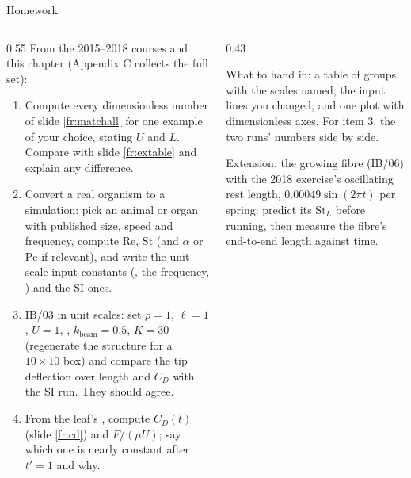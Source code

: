 \documentclass[aspectratio=169,11pt]{beamer}
\begin{document}
\begin{frame}{Homework}
\label{fr:hw}
\begin{columns}[T,onlytextwidth]
\begin{column}{0.55\textwidth}
\footnotesize From the 2015--2018 courses and this chapter (Appendix C collects the full set):
\begin{enumerate}
  \item Compute every dimensionless number of slide \ref{fr:matchall} for one example of your choice, stating $U$ and $L$. Compare with slide \ref{fr:extable} and explain any difference.
  \item Convert a real organism to a simulation: pick an animal or organ with published size, speed and frequency, compute $\mathrm{Re}$, $\mathrm{St}$ (and $\alpha$ or $\mathrm{Pe}$ if relevant), and write the unit-scale input constants (, the frequency, ) and the SI ones.
  \item IB/03 in unit scales: set $\rho = 1$, $\ell = 1$, $U = 1$, , $k_{\mathrm{beam}} = 0.5$, $K = 30$ (regenerate the structure for a $10 \times 10$ box) and compare the tip deflection over length and $C_D$ with the SI run. They should agree.
  \item From the leaf's , compute $C_D(t)$ (slide \ref{fr:cd}) and $F/(\mu U)$; say which one is nearly constant after $t' = 1$ and why.
\end{enumerate}
\end{column}
\begin{column}{0.43\textwidth}
\begin{punchbox}
\footnotesize What to hand in: a table of groups with the scales named, the input lines you changed, and one plot with dimensionless axes. For item 3, the two runs' numbers side by side.
\end{punchbox}
\vspace{1mm}
\footnotesize Extension: the growing fibre (IB/06) with the 2018 exercise's oscillating rest length, $0.00049\sin(2\pi t)$ per spring: predict its $\mathrm{St}_L$ before running, then measure the fibre's end-to-end length against time.
\end{column}
\end{columns}
\end{frame}
\end{document}
